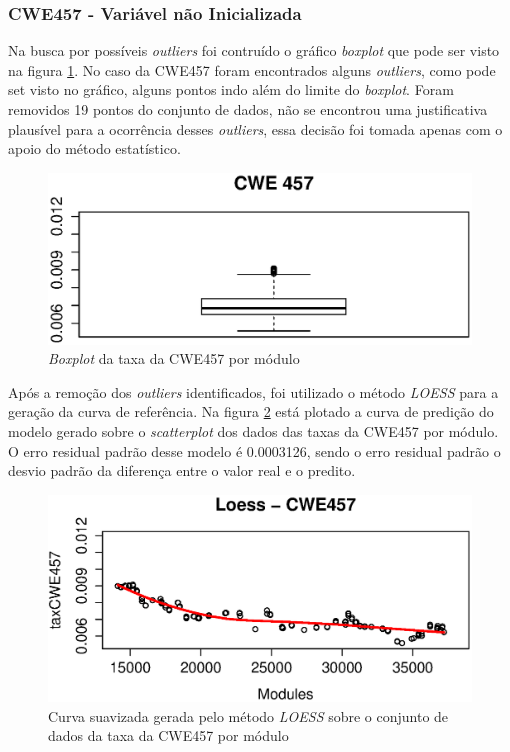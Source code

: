 \subsubsection{CWE457 - Variável não Inicializada}

Na busca por possíveis \textit{outliers} foi contruído o gráfico
\textit{boxplot} que pode ser visto na figura \ref{fig:cwe457-boxplot}. No caso
da CWE457 foram encontrados alguns \textit{outliers}, como pode set visto no
gráfico, alguns pontos indo além do limite do \textit{boxplot}. Foram removidos
19 pontos do conjunto de dados, não se encontrou uma justificativa plausível
para a ocorrência desses \textit{outliers}, essa decisão foi tomada apenas com o
apoio do método estatístico.

\begin{figure}[h]
  \centering
  \includegraphics[width=1.0\textwidth]
      {figuras/cwe457-boxplot.eps}
      \caption{\textit{Boxplot} da taxa da CWE457 por módulo}
  \label{fig:cwe457-boxplot}
\end{figure}

Após a remoção dos \textit{outliers} identificados, foi utilizado o método
\textit{LOESS} para a geração da curva de referência. Na figura
\ref{fig:cwe457-loess} está plotado a curva de predição do modelo gerado sobre o
\textit{scatterplot} dos dados das taxas da CWE457 por módulo. O erro residual
padrão desse modelo é 0.0003126, sendo o erro residual padrão o desvio padrão da
diferença entre o valor real e o predito.

\begin{figure}[h]
  \centering
  \includegraphics[width=1.0\textwidth]
      {figuras/cwe457-loess.eps}
      \caption{Curva suavizada gerada pelo método \textit{LOESS} sobre o
      conjunto de dados da taxa da CWE457 por módulo}
  \label{fig:cwe457-loess}
\end{figure}


